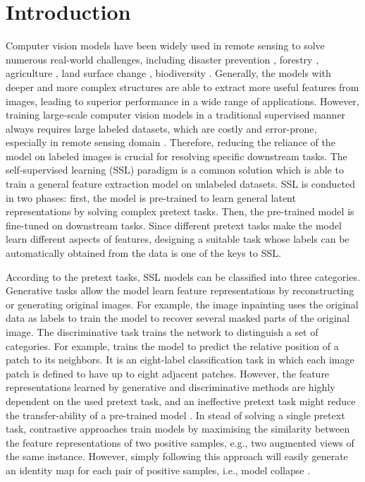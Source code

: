 \documentclass[10pt,twocolumn,letterpaper]{article}
\begin{document}
\section{Introduction}
\label{sec:intro}
Computer vision models have been widely used in remote sensing to solve numerous real-world challenges, including disaster prevention \cite{2000remote}, forestry \cite{2021Review}, agriculture \cite{Mulla2013Twenty}, land surface change \cite{2021A}, biodiversity \cite{turner2003remote}.
Generally, the models with deeper and more complex structures are able to extract more useful features from images, leading to superior performance in a wide range of applications.
However, training large-scale computer vision models in a traditional supervised manner always requires large labeled datasets, which are costly and error-prone, especially in remote sensing domain \cite{stojnic2021self}.
Therefore, reducing the reliance of the model on labeled images is crucial for resolving specific downstream tasks.
The self-supervised learning (SSL) paradigm is a common solution which is able to train a general feature extraction model on unlabeled datasets.
SSL is conducted in two phases: first, the model is pre-trained to learn general latent representations by solving complex pretext tasks. Then, the pre-trained model is fine-tuned on downstream tasks.
Since different pretext tasks make the model learn different aspects of features, designing a suitable task whose labels can be automatically obtained from the data is one of the keys to SSL.

According to the pretext tasks, SSL models can be classified into three categories.
Generative tasks allow the model learn feature representations by reconstructing or generating original images.
For example, the image inpainting \cite{pathak2016context} uses the original data as labels to train the model to recover several masked parts of the original image.
The discriminative task \cite{chen2020simple,dosovitskiy2014discriminative} trains the network to distinguish a set of categories.
For example, \cite{doersch2015unsupervised} trains the model to predict the relative position of a patch to its neighbors.
It is an eight-label classification task in which each image patch is defined to have up to eight adjacent patches.
However, the feature representations learned by generative and discriminative methods are highly dependent on the used pretext task, and an ineffective pretext task might reduce the transfer-ability of a pre-trained model \cite{wang2022selfreview}.
In stead of solving a single pretext task, contrastive approaches train models by maximising the similarity between the feature representations of two positive samples, e.g., two augmented views of the same instance. 
However, simply following this approach will easily generate an identity map for each pair of positive samples, i.e., model collapse \cite{wang2022selfreview}.
\end{document}
